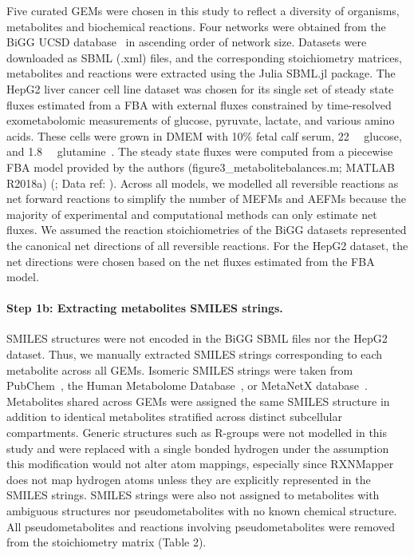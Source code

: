 \documentclass[12pt]{article}
\begin{document}
Five curated GEMs were chosen in this study to reflect a diversity of
organisms, metabolites and biochemical reactions. Four networks were
obtained from the BiGG UCSD database~\citep{KingZacharyA2016BMAp} in
ascending order of network size. Datasets were downloaded as SBML (.xml)
files, and the corresponding stoichiometry matrices, metabolites and
reactions were extracted using the Julia SBML.jl package. The HepG2 liver
cancer cell line dataset was chosen for its single set of steady state
fluxes estimated from a FBA with external fluxes constrained by
time-resolved exometabolomic measurements of glucose, pyruvate, lactate,
and various amino acids. These cells were grown in DMEM with 10\% fetal
calf serum, 22\SI{}{\milli\molar} glucose, and 1.8\SI{}{\milli\molar}
glutamine~\citep{NilssonAvlant2020Qaoa}. The steady state fluxes were
computed from a piecewise FBA model provided by the authors
(figure3\_metabolitebalances.m; MATLAB R2018a)
(\citealt{NilssonAvlant2020Qaoa}; Data ref:
\citealt{NilssonAvlant2020QaoaDATASET}). Across all models, we modelled
all reversible reactions as net forward reactions to simplify the number
of MEFMs and AEFMs because the majority of experimental and
computational methods can only estimate net fluxes. We assumed the
reaction stoichiometries of the BiGG datasets represented the canonical
net directions of all reversible reactions. For the HepG2 dataset, the net
directions were chosen based on the net fluxes estimated from the FBA
model.

\paragraph{Step 1b: Extracting metabolites SMILES strings.}

SMILES structures were not encoded in the BiGG SBML files nor the HepG2
dataset. Thus, we manually extracted SMILES strings corresponding to each
metabolite across all GEMs. Isomeric SMILES strings were taken from
PubChem~\citep{KimSunghwan2023P2u}, the Human Metabolome
Database~\citep{WishartDavidS2022H5tH}, or MetaNetX
database~\citep{MorettiSebastien2021Munf}. Metabolites shared across GEMs
were assigned the same SMILES structure in addition to identical
metabolites stratified across distinct subcellular compartments. Generic
structures such as R-groups were not modelled in this study and were
replaced with a single bonded hydrogen under the assumption this
modification would not alter atom mappings, especially since RXNMapper
does not map hydrogen atoms unless they are explicitly represented in the
SMILES strings. SMILES strings were also not assigned to metabolites with
ambiguous structures nor pseudometabolites with no known chemical
structure. All pseudometabolites and reactions involving pseudometabolites
were removed from the stoichiometry matrix (Table 2).
\end{document}
